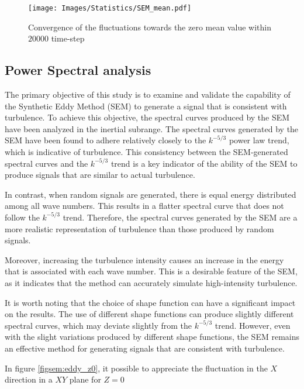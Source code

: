\documentclass{juliacon}
\begin{document}
\begin{figure}[h]
     \centering
         \texttt{[image: Images/Statistics/SEM\_mean.pdf]}
         \caption{Convergence of the fluctuations towards the  zero mean value within $\num{20000}$ time-step}
            \label{figsem:mean}
\end{figure}

 



\subsection{Power Spectral analysis}
The primary objective of this study is to examine and validate the capability of the Synthetic Eddy Method (SEM) to generate a signal that is consistent with turbulence. To achieve this objective, the spectral curves produced by the SEM have been analyzed in the inertial subrange. The spectral curves generated by the SEM have been found to adhere relatively closely to the $k^{-5/3}$ power law trend, which is indicative of turbulence. This consistency between the SEM-generated spectral curves and the $k^{-5/3}$ trend is a key indicator of the ability of the SEM to produce signals that are similar to actual turbulence.

In contrast, when random signals are generated, there is equal energy distributed among all wave numbers. This results in a flatter spectral curve that does not follow the $k^{-5/3}$ trend. Therefore, the spectral curves generated by the SEM are a more realistic representation of turbulence than those produced by random signals.

Moreover, increasing the turbulence intensity causes an increase in the energy that is associated with each wave number. This is a desirable feature of the SEM, as it indicates that the method can accurately simulate high-intensity turbulence.

It is worth noting that the choice of shape function can have a significant impact on the results. The use of different shape functions can produce slightly different spectral curves, which may deviate slightly from the $k^{-5/3}$ trend. However, even with the slight variations produced by different shape functions, the SEM remains an effective method for generating signals that are consistent with turbulence.

In figure \ref{figsem:eddy_z0}, it possible to appreciate the fluctuation in the $X$ direction in a $XY$ plane for $Z=0$
\end{document}
